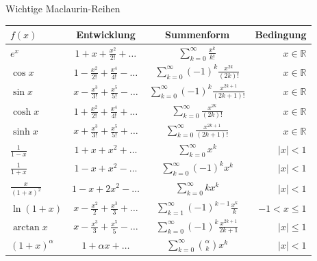 \begin{minipage}{\linewidth}
\Tab Wichtige Maclaurin-Reihen

\begin{tabular}{l c c r}
    $f(x)$ & Entwicklung & Summenform & Bedingung \\
    \hline
    $e^x$ & $1 + x + \frac{x^2}{2!} + \dots$ & $\sum_{k=0}^\infty \frac{x^k}{k!}$ & $x \in \mathbb{R}$ \\[1ex]
    $\cos x$ & $1 - \frac{x^2}{2!} + \frac{x^4}{4!} - \dots$ & $\sum_{k=0}^\infty (-1)^k \frac{x^{2k}}{(2k)!}$ & $x \in \mathbb{R}$ \\[1ex]
    $\sin x$ & $x - \frac{x^3}{3!} + \frac{x^5}{5!} - \dots$ & $\sum_{k=0}^\infty (-1)^k \frac{x^{2k+1}}{(2k+1)!}$ & $x \in \mathbb{R}$ \\[1ex]
    $\cosh x$ & $1 + \frac{x^2}{2!} + \frac{x^4}{4!} + \dots$ & $\sum_{k=0}^\infty \frac{x^{2k}}{(2k)!}$ & $x \in \mathbb{R}$ \\[1ex]
    $\sinh x$ & $x + \frac{x^3}{3!} + \frac{x^5}{5!} + \dots$ & $\sum_{k=0}^\infty \frac{x^{2k+1}}{(2k+1)!}$ & $x \in \mathbb{R}$ \\[1ex]
    \hline
    $\frac{1}{1-x}$ & $1 + x + x^2 + \dots$ & $\sum_{k=0}^\infty x^k$ & $|x| < 1$ \\[1ex]
    $\frac{1}{1+x}$ & $1 - x + x^2 - \dots$ & $\sum_{k=0}^\infty (-1)^k x^k$ & $|x| < 1$ \\[1ex]
    $\frac{x}{(1+x)^2}$ & $1 - x + 2x^2 - \dots$ & $\sum_{k=0}^\infty k x^k$ & $|x| < 1$ \\[1ex]
    $\ln(1+x)$ & $x - \frac{x^2}{2} + \frac{x^3}{3} + \dots$ & $\sum_{k=1}^\infty (-1)^{k-1} \frac{x^k}{k}$ & $-1 < x \le 1$ \\[1ex]
    $\arctan x$ & $x - \frac{x^3}{3} + \frac{x^5}{5} - \dots$ & $\sum_{k=0}^\infty (-1)^k \frac{x^{2k+1}}{2k+1}$ & $|x| \le 1$ \\[1ex]
    $(1+x)^\alpha$ & $1 + \alpha x + \dots$ & $\sum_{k=0}^\infty \binom{\alpha}{k} x^k$ & $|x| < 1$ \\
\end{tabular}
\end{minipage}

